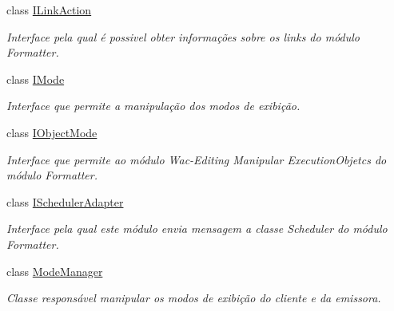 \begin{DoxyCompactItemize}
class \hyperlink{classbr_1_1ufscar_1_1lince_1_1ginga_1_1wac_1_1editing_1_1ILinkAction}{ILinkAction}
\begin{DoxyCompactList}\small\item\em Interface pela qual é possivel obter informações sobre os links do módulo Formatter. \item\end{DoxyCompactList}\item 
class \hyperlink{classbr_1_1ufscar_1_1lince_1_1ginga_1_1wac_1_1editing_1_1IMode}{IMode}
\begin{DoxyCompactList}\small\item\em Interface que permite a manipulação dos modos de exibição. \item\end{DoxyCompactList}\item 
class \hyperlink{classbr_1_1ufscar_1_1lince_1_1ginga_1_1wac_1_1editing_1_1IObjectMode}{IObjectMode}
\begin{DoxyCompactList}\small\item\em Interface que permite ao módulo Wac-\/Editing Manipular ExecutionObjetcs do módulo Formatter. \item\end{DoxyCompactList}\item 
class \hyperlink{classbr_1_1ufscar_1_1lince_1_1ginga_1_1wac_1_1editing_1_1ISchedulerAdapter}{ISchedulerAdapter}
\begin{DoxyCompactList}\small\item\em Interface pela qual este módulo envia mensagem a classe Scheduler do módulo Formatter. \item\end{DoxyCompactList}\item 
class \hyperlink{classbr_1_1ufscar_1_1lince_1_1ginga_1_1wac_1_1editing_1_1ModeManager}{ModeManager}
\begin{DoxyCompactList}\small\item\em Classe responsável manipular os modos de exibição do cliente e da emissora. \item\end{DoxyCompactList}\end{DoxyCompactItemize}

